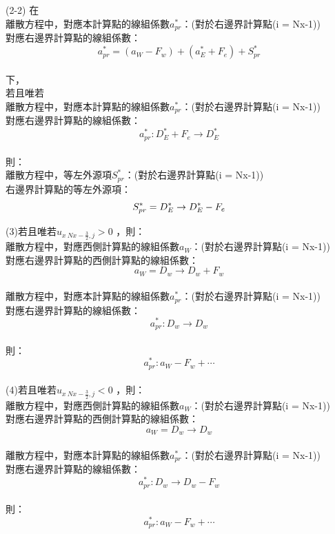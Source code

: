 \documentclass[12pt]{article}
\begin{document}
\noindent (2-2)
        在\\
        離散方程中，對應本計算點的線組係數$a_{pr}^{*}$：(對於右邊界計算點(i = Nx-1))\\    
        對應右邊界計算點的線組係數：\\
        $$a_{pr}^{*} = (a_{W}-F_{w}) + (a_{E}^{*} + F_{e}) + S_{pr}^{*}$$\\
        下，\\
        若且唯若\\
        離散方程中，對應本計算點的線組係數$a_{pr}^{*}$：(對於右邊界計算點(i = Nx-1))\\
        對應右邊界計算點的線組係數：\\
        $$a_{pr}^{*} :D_{E}^{*} + F_{e} \rightarrow D_{E}^{*} $$\\
        則：\\
        離散方程中，等左外源項$S_{pr}^{*}$：(對於右邊界計算點(i = Nx-1))\\
        右邊界計算點的等左外源項：\\
        \begin{equation}
        S_{pr}^{*} = D_{E}^{*} \rightarrow D_{E}^{*} - F_{e}\\
        \end{equation}

\noindent (3)若且唯若$u_{x\ Nx-\frac{3}{2} ,j} > 0$ ，則：\\
離散方程中，對應西側計算點的線組係數$a_{W}$：(對於右邊界計算點(i = Nx-1))\\
對應右邊界計算點的西側計算點的線組係數：\\
$$a_{W} = D_{w} \rightarrow D_{w} + F_{w}$$\\
離散方程中，對應本計算點的線組係數$a_{pr}^{*}$：(對於右邊界計算點(i = Nx-1))\\
對應右邊界計算點的線組係數：\\
$$a_{pr}^{*} : D_{w} \rightarrow D_{w}$$\\
\noindent 則：\\
\begin{equation}a_{pr}^{*} : a_{W} - F_{w} +\cdots\end{equation}\\


\noindent (4)若且唯若$u_{x\ Nx-\frac{3}{2} ,j} < 0$ ，則：\\
離散方程中，對應西側計算點的線組係數$a_{W}$：(對於右邊界計算點(i = Nx-1))\\
對應右邊界計算點的西側計算點的線組係數：\\
$$a_{W} = D_{w} \rightarrow D_{w} $$\\
離散方程中，對應本計算點的線組係數$a_{pr}^{*}$：(對於右邊界計算點(i = Nx-1))\\
對應右邊界計算點的線組係數：\\
$$a_{pr}^{*} : D_{w} \rightarrow D_{w} - F_{w}$$\\
\noindent 則：\\
\begin{equation}a_{pr}^{*} : a_{W} - F_{w} +\cdots\end{equation}\\
\end{document}
